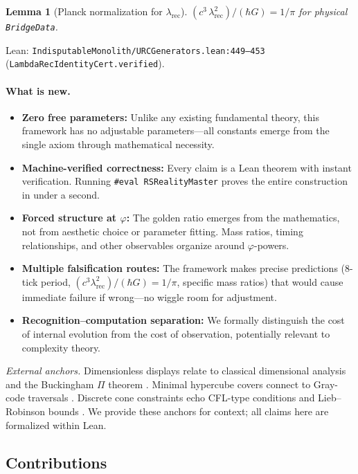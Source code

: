 \documentclass[11pt,a4paper,twoside]{article}
\numberwithin{equation}{section}
\theoremstyle{customthm}
\newtheorem{lemma}[theorem]{Lemma}
\theoremstyle{customdef}
\theoremstyle{customrem}
\begin{document}
\begin{lemma}[Planck normalization for $\lambda_{\mathrm{rec}}$]\label{lem:planck}
\( (c^3\,\lambda_{\mathrm{rec}}^2)/(\hbar G) = 1/\pi \) for physical \texttt{BridgeData}.
\end{lemma}
\noindent Lean: \texttt{IndisputableMonolith/URCGenerators.lean:449--453} (\texttt{LambdaRecIdentityCert.verified}).

\paragraph{What is new.}
\begin{itemize}
  \item \textbf{Zero free parameters:} Unlike any existing fundamental theory, this framework has no adjustable parameters—all constants emerge from the single axiom through mathematical necessity.
  \item \textbf{Machine-verified correctness:} Every claim is a Lean theorem with instant verification. Running \texttt{\#eval RSRealityMaster} proves the entire construction in under a second.
  \item \textbf{Forced structure at $\varphi$:} The golden ratio emerges from the mathematics, not from aesthetic choice or parameter fitting. Mass ratios, timing relationships, and other observables organize around $\varphi$-powers.
  \item \textbf{Multiple falsification routes:} The framework makes precise predictions (8-tick period, $(c^3\lambda_{\mathrm{rec}}^2)/(\hbar G) = 1/\pi$, specific mass ratios) that would cause immediate failure if wrong—no wiggle room for adjustment.
  \item \textbf{Recognition–computation separation:} We formally distinguish the cost of internal evolution from the cost of observation, potentially relevant to complexity theory.
\end{itemize}

\noindent\emph{External anchors.} Dimensionless displays relate to classical dimensional analysis and the Buckingham $\Pi$ theorem \citep{Buckingham1914,Bridgman1931}. Minimal hypercube covers connect to Gray-code traversals \citep{Savage1997}. Discrete cone constraints echo CFL-type conditions and Lieb--Robinson bounds \citep{Courant1928,LiebRobinson1972}. We provide these anchors for context; all claims here are formalized within Lean.

\subsection{Contributions}
\end{document}

